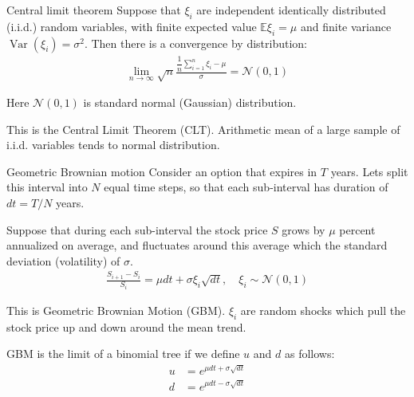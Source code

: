 \documentclass{beamer}
\begin{document}
\begin{frame}{Central limit theorem}
\justify
Suppose that $\xi_i$ are independent identically distributed (i.i.d.) random variables, with finite expected value $\mathbb{E}\xi_i=\mu$ and finite variance $\operatorname{Var}(\xi_i) = \sigma^2$. Then there is a convergence by distribution:
\begin{align*}
\lim_{n \to \infty} \sqrt{n}\frac{\dfrac{1}{n}\sum\limits_{i=1}^{n}\xi_i - \mu}{\sigma} = \mathcal{N}(0, 1)
\end{align*}

\justify
Here $\mathcal{N}(0, 1)$ is standard normal (Gaussian) distribution.

\justify
This is the Central Limit Theorem (CLT). Arithmetic mean of a large sample of i.i.d. variables tends to normal distribution.
\end{frame}



\begin{frame}{Geometric Brownian motion}
\justify
Consider an option that expires in $T$ years. Lets split this interval into $N$ equal time steps, so that each sub-interval has duration of $dt = T/N$ years.

\justify
Suppose that during each sub-interval the stock price $S$ grows by $\mu$ percent annualized on average, and fluctuates around this average which the standard deviation (volatility) of $\sigma$.
\begin{align*}
\frac{S_{i+1} - S_i}{S_i} = \mu dt + \sigma\xi_i\sqrt{dt}, \quad \xi_i \sim \mathcal{N}(0, 1)
\end{align*}

\justify
This is Geometric Brownian Motion (GBM). $\xi_i$ are random shocks which pull the stock price up and down around the mean trend. 

\justify
GBM is the limit of a binomial tree if we define $u$ and $d$ as follows:
\begin{align*}
u &= e^{\mu dt + \sigma\sqrt{dt}} \\
d &= e^{\mu dt - \sigma\sqrt{dt}}
\end{align*}
\end{frame}



\newcommand{\plotBrownianMotion}[2] {
	
	\addplot[
		color = #2,
		mark = none,
		thick
	]
	table[
		x=t,
		y=s,
		col sep=comma
	]
	{#1};
	
	\addplot[
		color = #2,
		mark = none,
		thick,
		dashed,
		forget plot
	] 
	table[
		x=t,
		y=trend,
		col sep=comma
	]
	{#1};
}
\end{document}

